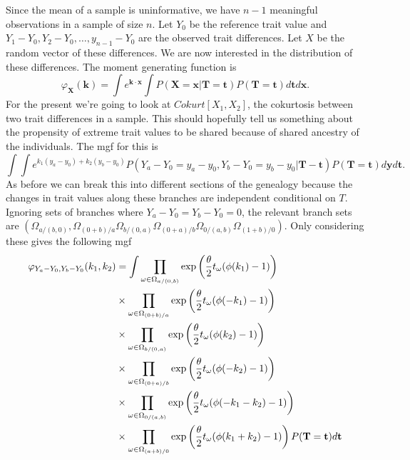 Since the mean of a sample is uninformative, we have $n-1$ meaningful
observations in a sample of size $n$. Let $Y_0$ be the reference trait value and
$Y_1-Y_0,Y_2-Y_0,\ldots,y_{n-1}-Y_0$ are the observed trait differences. Let $X$
be the random vector of these differences. We are now interested in the
distribution of these differences. The moment generating function is
\begin{equation}
  \varphi_{\mathbf{X}}(\mathbf{k}) =
  \int e^{\mathbf{k} \cdot \mathbf{x} }
  \int P(\mathbf{X}=\mathbf{x}|\mathbf{T} = \mathbf{t})
  P(\mathbf{T}=\mathbf{t})d\mathbf{t}d\mathbf{x}.
\end{equation}
For the present we're going to look at $Cokurt[X_1,X_2]$, the cokurtosis between
two trait differences in a sample. This should hopefully tell us something about
the propensity of extreme trait values to be shared because of shared ancestry
of the individuals. The mgf for this is
\begin{equation}
  \int \int e^{k_1(y_a-y_0) + k_2(y_b-y_0)} P(Y_a-Y_0=y_a-y_0,Y_b-Y_0=y_b-y_0|\mathbf{T}-\mathbf{t})
  P(\mathbf{T}=\mathbf{t})d\mathbf{y}d\mathbf{t}.
\end{equation}
As before we can break this into different sections of the genealogy because the
changes in trait values along these branches are independent conditional on $T$.
Ignoring sets of branches where $Y_a-Y_0=Y_b-Y_0=0$, the relevant branch sets
are $(\Omega_{a/(b,0)},\Omega_{(0+b)/a}\Omega_{b/(0,a)}\Omega_{(0+a)/b}\Omega_{0/(a,b)}\Omega_{(1+b)/0})$.
Only considering these gives the following mgf
\begin{align*}
  \varphi_{Y_a-Y_0,Y_b-Y_0}(k_1,k_2) &=
  \int \prod_{\omega \in \Omega_{a/(0,b)}}\exp\left( \frac{\theta}{2} t_{\omega} (\phi(k_1)-1) \right) \\
  &\times \prod_{\omega \in \Omega_{(0+b)/a}}\exp\left( \frac{\theta}{2} t_{\omega} (\phi(-k_1)-1) \right) \\
  &\times \prod_{\omega \in \Omega_{b/(0,a)}}\exp\left( \frac{\theta}{2} t_{\omega} (\phi(k_2)-1) \right) \\
  &\times \prod_{\omega \in \Omega_{(0+a)/b}}\exp\left( \frac{\theta}{2} t_{\omega} (\phi(-k_2)-1) \right) \\
  &\times \prod_{\omega \in \Omega_{0/(a,b)}}\exp\left( \frac{\theta}{2} t_{\omega} (\phi(-k_1-k_2)-1) \right) \\
  &\times \prod_{\omega \in \Omega_{(a+b)/0}}\exp\left( \frac{\theta}{2} t_{\omega} (\phi(k_1+k_2)-1) \right)
  P(\mathbf{T}=\mathbf{t})d\mathbf{t}
\end{align*}
